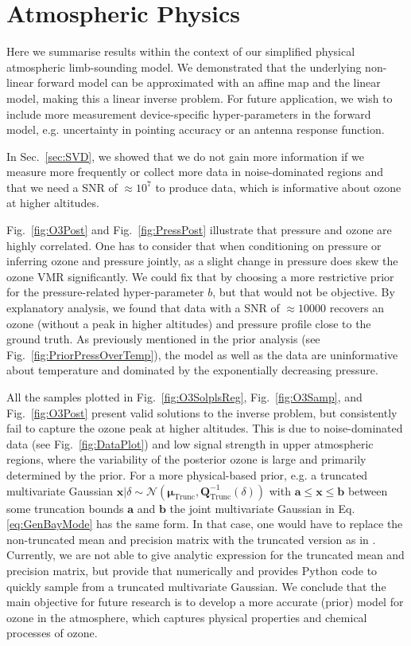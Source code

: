 \section{Atmospheric Physics}
Here we summarise results within the context of our simplified physical atmospheric limb-sounding model.
We demonstrated that the underlying non-linear forward model can be approximated with an affine map and the linear model, making this a linear inverse problem.
For future application, we wish to include more measurement device-specific hyper-parameters in the forward model, e.g. uncertainty in pointing accuracy or an antenna response function.

In Sec.~\ref{sec:SVD}, we showed that we do not gain more information if we measure more frequently or collect more data in noise-dominated regions and that we need a SNR of $\approx10^7$ to produce data, which is informative about ozone at higher altitudes.

Fig.~\ref{fig:O3Post} and Fig.~\ref{fig:PressPost} illustrate that pressure and ozone are highly correlated.
One has to consider that when conditioning on pressure or inferring ozone and pressure jointly, as a slight change in pressure does skew the ozone VMR significantly.
We could fix that by choosing a more restrictive prior for the pressure-related hyper-parameter $b$, but that would not be objective.
By explanatory analysis, we found that data with a SNR of $\approx 10000$ recovers an ozone (without a peak in higher altitudes) and pressure profile close to the ground truth.
As previously mentioned in the prior analysis (see Fig.~\ref{fig:PriorPressOverTemp}), the model as well as the data are uninformative about temperature and dominated by the exponentially decreasing pressure.

All the samples plotted in Fig.~\ref{fig:O3SolplsReg}, Fig.~\ref{fig:O3Samp}, and Fig.~\ref{fig:O3Post} present valid solutions to the inverse problem, but consistently fail to capture the ozone peak at higher altitudes.
This is due to noise-dominated data (see Fig.~\ref{fig:DataPlot}) and low signal strength in upper atmospheric regions, where the variability of the posterior ozone is large and primarily determined by the prior.
For a more physical-based prior, e.g. a truncated multivariate Gaussian $\bm{x} | \delta \sim \mathcal{N}(\bm{\mu}_{\text{Trunc}}, \bm{Q}^{-1}_{\text{Trunc}}(\delta))$ with $\bm{a}\leq \bm{x} \leq \bm{b}$ between some truncation bounds $\bm{a}$ and $\bm{b}$ the joint multivariate Gaussian in Eq. \ref{eq:GenBayMode} has the same form.
In that case, one would have to replace the non-truncated mean and precision matrix with the truncated version as in \cite[pp. 204-205]{Kotz2000truncMulti}.
Currently, we are not able to give analytic expression for the truncated mean and precision matrix, but \cite{ManjunathWilhel2021} provide that numerically and \cite{BotevTruncMulti} provides Python code to quickly sample from a truncated multivariate Gaussian.
We conclude that the main objective for future research is to develop a more accurate (prior) model for ozone in the atmosphere, which captures physical properties and chemical processes of ozone.




